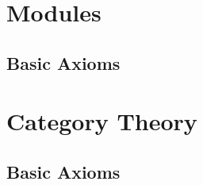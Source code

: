 \documentclass[a4paper,sfsidenotes,openany]{tufte-book}
\theoremstyle{theorem}
\begin{document}
\newpage

\chapter{Modules}
\begin{fullwidth}
\section{Basic Axioms}

\end{fullwidth}

\newpage

\chapter{Category Theory}
\begin{fullwidth}
\section{Basic Axioms}

\end{fullwidth}

\newpage

\printindex
\end{document}
